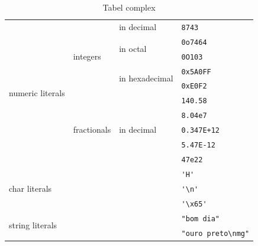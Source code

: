 \begin{small}
    \begin{longtable}[c]{|l|l|l|l|}
		\caption{Tabel complex}\\
		\hline
        \multirow{10}{*}{numeric literals} & \multirow{5}{*}{integers} & in decimal & \verb|8743| \\ \cline{3-4}
        & & \multirow{2}{*}{in octal} & \verb|0o7464| \\ \cline{4-4}
        & & & \verb|0O103| \\ \cline{3-4}
        & & \multirow{2}{*}{in hexadecimal} & \verb|0x5A0FF| \\ \cline{4-4}
        & & & \verb|0xE0F2| \\ \cline{2-4}
        & \multirow{5}{*}{fractionals} & \multirow{5}{*}{in decimal} & \verb|140.58| \\ \cline{4-4}
        & & & \verb|8.04e7| \\ \cline{4-4}
        & & & \verb|0.347E+12| \\ \cline{4-4}
        & & & \verb|5.47E-12| \\ \cline{4-4}
        & & & \verb|47e22| \\ \cline{1-4}
        \multicolumn{3}{|l|}{\multirow{3}{*}{char literals}} & \verb|'H'| \\ \cline{4-4}
        \multicolumn{3}{|l|}{} & \verb|'\n'| \\ \cline{4-4}          %
        \multicolumn{3}{|l|}{} & \verb|'\x65'| \\ \cline{1-4}        %
        \multicolumn{3}{|l|}{\multirow{2}{*}{string literals}} & \verb|"bom dia"| \\ \cline{4-4}
        \multicolumn{3}{|l|}{} & \verb|"ouro preto\nmg"| \\ \cline{1-4}          %
	\end{longtable}
\end{small}

